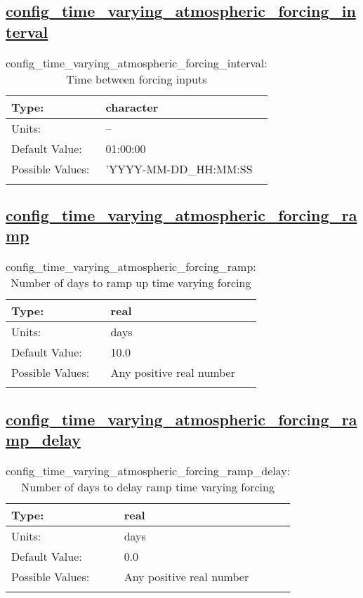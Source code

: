 \subsection[config\_time\_varying\_atmospheric\_forcing\_interval]{\hyperref[sec:nm_tab_time_varying_forcing]{config\_time\_varying\_atmospheric\_forcing\_interval}}
\label{subsec:nm_sec_config_time_varying_atmospheric_forcing_interval}
\begin{center}
\begin{longtable}{| p{2.0in} || p{4.0in} |}
    \hline
    Type: & character \\
    \hline
    Units: & -- \\
    \hline
    Default Value: & 01:00:00 \\
    \hline
    Possible Values: & 'YYYY-MM-DD\_HH:MM:SS \\
    \hline
    \caption{config\_time\_varying\_atmospheric\_forcing\_interval: Time between forcing inputs}
\end{longtable}
\end{center}
\subsection[config\_time\_varying\_atmospheric\_forcing\_ramp]{\hyperref[sec:nm_tab_time_varying_forcing]{config\_time\_varying\_atmospheric\_forcing\_ramp}}
\label{subsec:nm_sec_config_time_varying_atmospheric_forcing_ramp}
\begin{center}
\begin{longtable}{| p{2.0in} || p{4.0in} |}
    \hline
    Type: & real \\
    \hline
    Units: & \si{days} \\
    \hline
    Default Value: & 10.0 \\
    \hline
    Possible Values: & Any positive real number \\
    \hline
    \caption{config\_time\_varying\_atmospheric\_forcing\_ramp: Number of days to ramp up time varying forcing}
\end{longtable}
\end{center}
\subsection[config\_time\_varying\_atmospheric\_forcing\_ramp\_delay]{\hyperref[sec:nm_tab_time_varying_forcing]{config\_time\_varying\_atmospheric\_forcing\_ramp\_delay}}
\label{subsec:nm_sec_config_time_varying_atmospheric_forcing_ramp_delay}
\begin{center}
\begin{longtable}{| p{2.0in} || p{4.0in} |}
    \hline
    Type: & real \\
    \hline
    Units: & \si{days} \\
    \hline
    Default Value: & 0.0 \\
    \hline
    Possible Values: & Any positive real number \\
    \hline
    \caption{config\_time\_varying\_atmospheric\_forcing\_ramp\_delay: Number of days to delay ramp time varying forcing}
\end{longtable}
\end{center}
